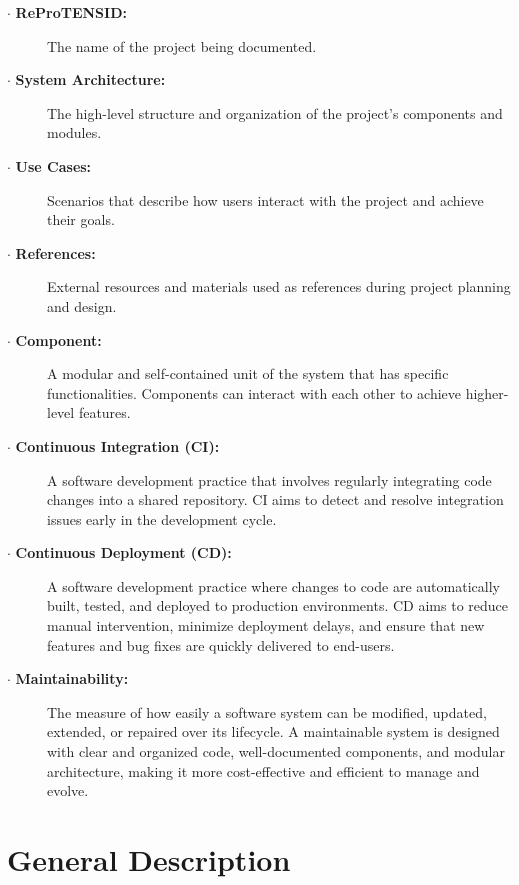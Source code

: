 \documentclass{report}
\begin{document}
\begin{description}
    \item[$\cdot$ \textbf{ReProTENSID:}] The name of the project being documented.
    
    \item[$\cdot$ \textbf{System Architecture:}] The high-level structure and organization of the project's components and modules.
    
    \item[$\cdot$ \textbf{Use Cases:}] Scenarios that describe how users interact with the project and achieve their goals.
        
    \item[$\cdot$ \textbf{References:}] External resources and materials used as references during project planning and design.

    \item[$\cdot$ \textbf{Component:}] A modular and self-contained unit of the system that has specific functionalities. Components can interact with each other to achieve higher-level features.

    \item[$\cdot$ \textbf{Continuous Integration (CI):}] A software development practice that involves regularly integrating code changes into a shared repository. CI aims to detect and resolve integration issues early in the development cycle.

    \item[$\cdot$ \textbf{Continuous Deployment (CD):}] A software development practice where changes to code are automatically built, tested, and deployed to production environments. CD aims to reduce manual intervention, minimize deployment delays, and ensure that new features and bug fixes are quickly delivered to end-users.

    \item[$\cdot$ \textbf{Maintainability:}] The measure of how easily a software system can be modified, updated, extended, or repaired over its lifecycle. A maintainable system is designed with clear and organized code, well-documented components, and modular architecture, making it more cost-effective and efficient to manage and evolve.

\end{description}



\chapter{General Description}
\end{document}
